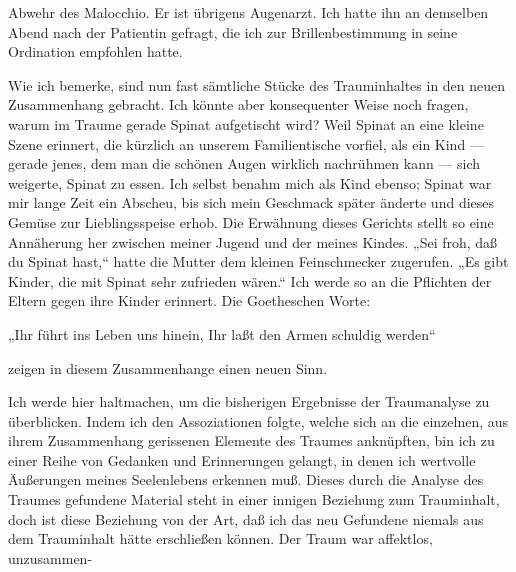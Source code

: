 \documentclass[twoside=true,titlepage=false,open=any, parskip=never, fontsize=10pt, headings=small, chapterprefix=false, appendixprefix=false]{scrbook}
\begin{document}
         
            
            
            
        \pstart
        Abwehr des Malocchio. Er ist übrigens Augenarzt.
               Ich hatte ihn an demselben Abend nach der Patientin gefragt, die ich zur
                  Brillenbestimmung in seine Ordination
               empfohlen hatte.
        \pend
    
            
        \pstart
        Wie ich bemerke, sind nun fast sämtliche Stücke des Trauminhaltes in
               den neuen Zusammenhang gebracht. Ich könnte aber konsequenter Weise noch fragen,
               warum im Traume gerade Spinat aufgetischt wird? Weil Spinat an eine kleine Szene erinnert, die kürzlich an unserem
               Familientische vorfiel, als ein Kind — gerade jenes, dem man die schönen Augen wirklich nachrühmen kann
               — sich weigerte, Spinat zu essen. Ich selbst benahm mich als Kind ebenso; Spinat war mir lange Zeit ein Abscheu, bis sich
               mein Geschmack später änderte und dieses Gemüse zur Lieblingsspeise erhob. Die
               Erwähnung dieses Gerichts stellt so eine Annäherung her zwischen meiner Jugend
               und der meines Kindes. „Sei froh, daß du Spinat hast,“ hatte die Mutter dem
               kleinen Feinschmecker zugerufen. „Es gibt Kinder, die mit Spinat sehr zufrieden
               wären.“ Ich werde so an die Pflichten der Eltern gegen ihre Kinder erinnert. Die
               Goetheschen Worte:
        \pend
    
            
        \pstart
        „Ihr führt ins Leben uns hinein, Ihr laßt den Armen schuldig werden“
        \pend
    
            
            
        \pstart
        zeigen in diesem Zusammenhange einen neuen Sinn.
        \pend
    
            
        \pstart
        Ich werde hier haltmachen, um die bisherigen Ergebnisse der Traumanalyse zu
               überblicken. Indem ich den Assoziationen folgte, welche sich an die einzelnen,
               aus ihrem Zusammenhang gerissenen Elemente des Traumes anknüpften, bin ich zu
               einer Reihe von Gedanken und Erinnerungen gelangt, in denen ich wertvolle
               Äußerungen meines Seelenlebens erkennen muß. Dieses durch die Analyse des
               Traumes gefundene Material steht in einer innigen Beziehung zum Trauminhalt,
               doch ist diese Beziehung von der Art, daß ich das neu Gefundene niemals aus dem
               Trauminhalt hätte erschließen können. Der Traum war affektlos, unzusammen-
        \pend
    
\end{document}

